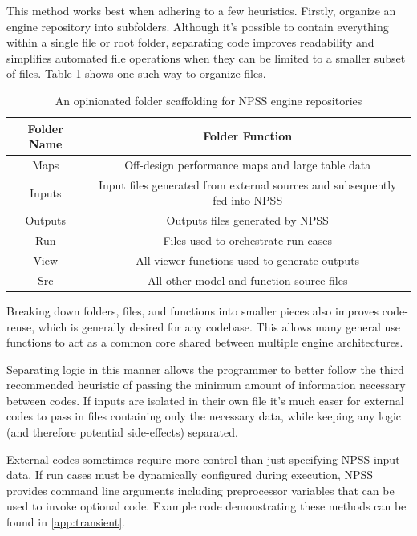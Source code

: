 \documentclass[heading.tex]{subfiles}
\begin{document}
This method works best when adhering to a few heuristics. Firstly, organize an engine repository
into subfolders. Although it's possible to contain everything within a single file or root folder, separating code
improves readability and simplifies automated file operations when they can be limited to a smaller subset of files.
Table \ref{tab:Scaffolding} shows one such way to organize files.

\begin{table}[H]
\centering
\begin{tabular}{|c|c|}
\hline 
Folder Name & Folder Function \\ 
\hline \hline
Maps & Off-design performance maps and large table data \\ 
\hline 
Inputs & Input files generated from external sources and subsequently fed into NPSS \\ 
\hline 
Outputs & Outputs files generated by NPSS \\ 
\hline 
Run & Files used to orchestrate run cases \\ 
\hline 
View & All viewer functions used to generate outputs \\ 
\hline 
Src & All other model and function source files \\ 
\hline 
\end{tabular} 
\caption{An opinionated folder scaffolding for NPSS engine repositories}
\label{tab:Scaffolding}
\end{table}

Breaking down folders, files, and functions into smaller pieces also improves code-reuse,
which is generally desired for any codebase.
This allows many general use functions to act as a common core shared between multiple engine architectures.

Separating logic in this manner allows the programmer to better follow the third recommended heuristic
of passing the minimum amount of information necessary between codes. If inputs are isolated in their own file
it's much easer for external codes to pass in files containing only the necessary data, 
while keeping any logic (and therefore potential side-effects) separated.

External codes sometimes require more control than just specifying NPSS input data.
If run cases must be dynamically configured during execution,
NPSS provides command line arguments \cite[chap.~2.1]{NPSS}
including preprocessor variables that can be used to invoke optional code.
Example code demonstrating these methods can be found in \cref{app:transient}.
\end{document}

